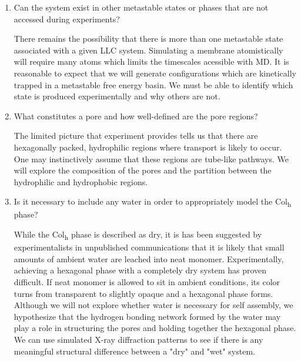 \documentclass{article}
\begin{document}
\begin{enumerate}
  \item Can the system exist in other metastable states or phases that are not
  accessed during experiments? \label{point:metastable}
  
  There remains the possibility that there is more than one metastable state
  associated with a given LLC system. Simulating a membrane atomistically will
  require many atoms which limits the timescales acessible with MD. It is
  reasonable to expect that we will generate configurations which are kinetically
  trapped in a metastable free energy basin. We must be able to identify which
  state is produced experimentally and why others are not.

  \item What constitutes a pore and how well-defined are the pore regions? \label{point:poredefinition}

  The limited picture that experiment provides tells us that there are
  hexagonally packed, hydrophilic regions where transport is likely to occur.
  One may instinctively assume that these regions are tube-like pathways. We will
  explore the composition of the pores and the partition between the
  hydrophilic and hydrophobic regions. 

  \item Is it necessary to include any water in order to appropriately model
  the Col\textsubscript{h} phase? \label{point:water}

  While the Col\textsubscript{h} phase is described as dry, it is has been
  suggested by experimentalists in unpublished communications that it is likely
  that small amounts of ambient water are leached into neat monomer.
  Experimentally, achieving a hexagonal phase with a completely dry system has
  proven difficult. If neat monomer is allowed to sit in ambient conditions, its
  color turns from transparent to slightly opaque and a hexagonal phase forms.
  Although we will not explore whether water is necessary for self assembly, we
  hypothesize that the hydrogen bonding network formed by the water may play a
  role in structuring the pores and holding together the hexagonal phase. We can
  use simulated X-ray diffraction patterns to see if there is any meaningful
  structural difference between a "dry" and "wet" system.

  \end{enumerate}
  
 
\end{document}
